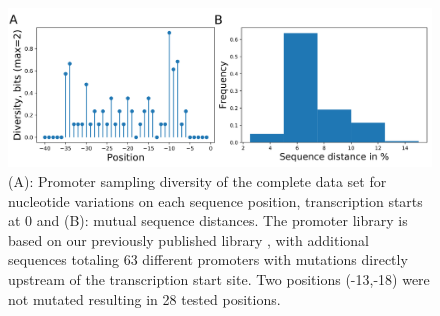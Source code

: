 \documentclass[utf8]{frontiersSCNS} %
\begin{document}
\begin{figure}[h!]%
    \begin{center}
        \includegraphics[width=.85\linewidth]{Figures/Pput-SampleDiversity.png}
    \end{center}
    \caption{(A): Promoter sampling diversity of the complete data set for nucleotide variations on each sequence position, transcription starts at 0 and (B): mutual sequence distances. The promoter library is based on our previously published library \citep{Kobbing2020}, with additional sequences totaling 63 different promoters with mutations directly upstream of the transcription start site. Two positions (\mbox{-13,-18}) were not mutated resulting in 28 tested positions.}
    \label{Fig:PputSampDiv}
\end{figure}
\end{document}
